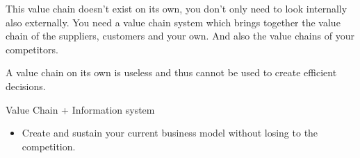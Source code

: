 \documentclass{article}
\begin{document}
\hfill \newline
This value chain doesn't exist on its own, you don't only need to look internally also externally. You need a value chain system which brings together the value chain of the suppliers, customers and your own. And also the value chains of your competitors. 

\hfill \newline
A value chain on its own is useless and thus cannot be used to create efficient decisions.

\hfill \newline
Value Chain + Information system

\begin{itemize}
\item  Create and sustain your current business model without losing to the competition.
\end{itemize}
\end{document}
